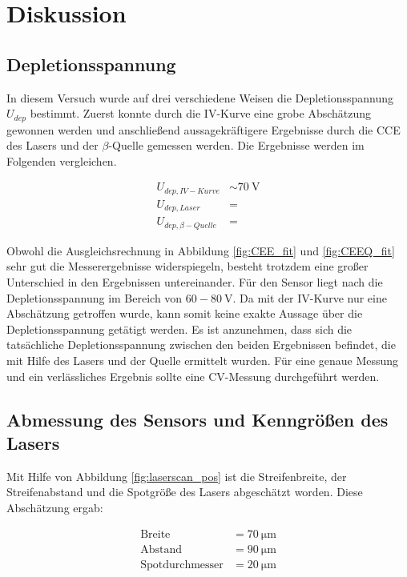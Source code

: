 \section{Diskussion}
\label{sec:Diskussion}

\subsection{Depletionsspannung}
In diesem Versuch wurde auf drei verschiedene Weisen die Depletionsspannung $U_{dep}$ bestimmt. Zuerst konnte durch die IV-Kurve eine grobe Abschätzung gewonnen werden und anschließend aussagekräftigere Ergebnisse durch die CCE des Lasers und der $\beta$-Quelle gemessen werden. Die Ergebnisse werden im Folgenden vergleichen.
 
\begin{align}
	U_{dep, IV-Kurve} &\sim \SI{70}{\volt}\\
	U_{dep, Laser} &= \\
	U_{dep, \beta -Quelle} &= 
\end{align} 

Obwohl die Ausgleichsrechnung in Abbildung \ref{fig:CEE_fit} und \ref{fig:CEEQ_fit} sehr gut die Messerergebnisse widerspiegeln, besteht trotzdem eine großer Unterschied in den Ergebnissen untereinander. Für den Sensor liegt nach \cite{skript} die Depletionsspannung im Bereich von $60-\SI{80}{\volt}$. Da mit der IV-Kurve nur eine Abschätzung getroffen wurde, kann somit keine exakte Aussage über die Depletionsspannung getätigt werden. Es ist anzunehmen, dass sich die tatsächliche Depletionsspannung zwischen den beiden Ergebnissen befindet, die mit Hilfe des Lasers und der Quelle ermittelt wurden. Für eine genaue Messung und ein verlässliches Ergebnis sollte eine CV-Messung durchgeführt werden.



\subsection{Abmessung des Sensors und Kenngrößen des Lasers}
Mit Hilfe von Abbildung \ref{fig:laserscan_pos} ist die Streifenbreite, der Streifenabstand und die Spotgröße des Lasers abgeschätzt worden. Diese Abschätzung ergab:

\begin{align}
	\text{Breite} &= \SI{70}{\micro\meter}\\
	\text{Abstand} &= \SI{90}{\micro\meter}\\
	\text{Spotdurchmesser} &= \SI{20}{\micro\meter}
\end{align} 

